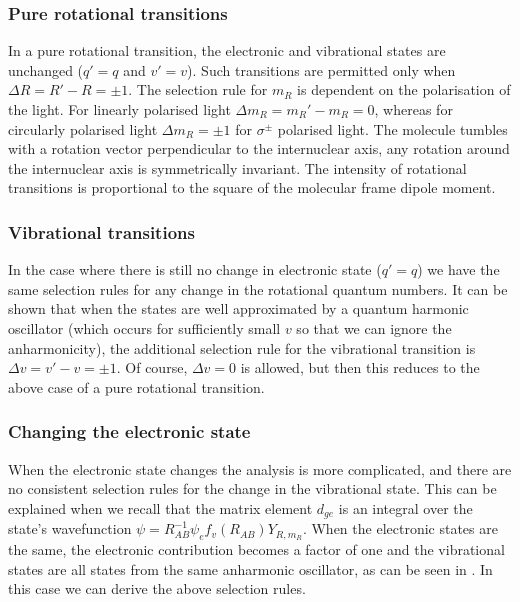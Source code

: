 \subsubsection{Pure rotational transitions}

In a pure rotational transition, the electronic and vibrational states are
unchanged ($q'=q$ and $v'=v$). Such transitions are permitted only when $\Delta
R = R' - R = \pm1$. The selection rule for $m_R$ is dependent on the
polarisation of the light. For linearly polarised light $\Delta m_R = m_R' -
m_R = 0$, whereas for circularly polarised light $\Delta m_R =  \pm1$ for
$\sigma^\pm$ polarised light. The molecule tumbles with a rotation vector
perpendicular to the internuclear axis, any rotation around the internuclear
axis is symmetrically invariant. The intensity of rotational transitions is
proportional to the square of the molecular frame dipole moment.

\subsubsection{Vibrational transitions}

In the case where there is still no change in electronic state ($q'=q$) we have
the same selection rules for any change in the rotational quantum numbers. It
can be shown that when the states are well approximated by a quantum harmonic
oscillator (which occurs for sufficiently small $v$ so that we can ignore the
anharmonicity), the additional selection rule for the vibrational transition is
$\Delta v = v' - v = \pm 1$. Of course, $\Delta v = 0$ is allowed, but then
this reduces to the above case of a pure rotational transition.

\subsubsection{Changing the electronic state}

When the electronic state changes the analysis is more complicated, and there
are no consistent selection rules for the change in the vibrational state. This
can be explained when we recall that the matrix element $d_{ge}$ is an integral
over the state's wavefunction $\psi = R_{AB}^{-1}\psi_ef_v(R_{AB}) Y_{R, m_R}$.
When the electronic states are the same, the electronic contribution becomes a
factor of one and the vibrational states are all states from the same
anharmonic oscillator, as can be seen in . In
this case we can derive the above selection rules.

